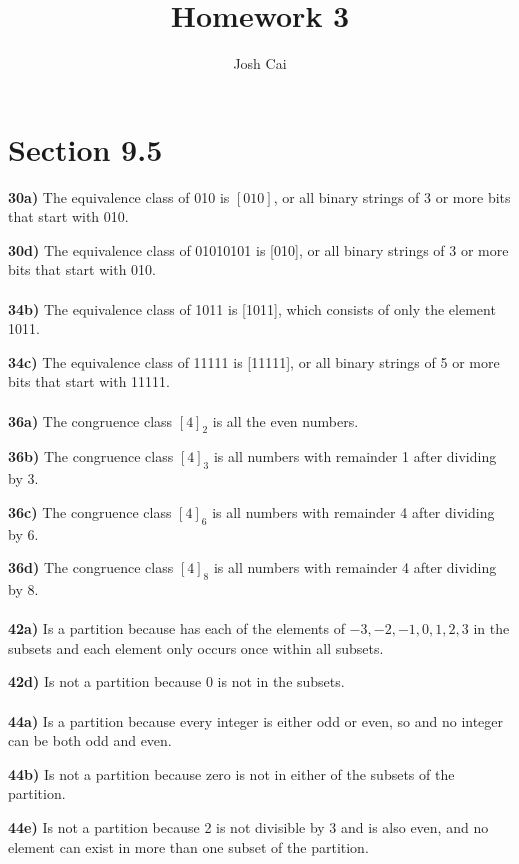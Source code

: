 \documentclass{article}
\begin{document}
\title{Homework 3}
\author{Josh Cai}

\maketitle
\section*{Section 9.5}



\textbf{30a)} The equivalence class of 010 is $[010]$, or all binary strings of 3 or more bits that start with 010.

\noindent\textbf{30d)}  The equivalence class of 01010101 is [010], or all binary strings of 3 or more bits that start with 010.
\\\\
\noindent\textbf{34b)} The equivalence class of 1011 is [1011], which consists of only the element 1011.

\noindent\textbf{34c)}  The equivalence class of 11111 is [11111], or all binary strings of 5 or more bits that start with 11111.
\\\\
\noindent\textbf{36a)} The congruence class $[4]_2$ is all the even numbers.

\noindent\textbf{36b)}  The congruence class $[4]_3$ is all numbers with remainder 1 after dividing by 3.

\noindent\textbf{36c)} The congruence class $[4]_6$ is all numbers with remainder 4 after dividing by 6.

\noindent\textbf{36d)}  The congruence class $[4]_8$ is all numbers with remainder 4 after dividing by 8.
\\\\
\noindent\textbf{42a)} Is a partition because has each of the elements of ${-3,-2,-1,0,1,2,3}$ in the subsets and each element only occurs once within all subsets.

\noindent\textbf{42d)}  Is not a partition because $0$ is not in the subsets.
\\\\
\noindent\textbf{44a)} Is a partition because every integer is either odd or even, so and no integer can be both odd and even.

\noindent\textbf{44b)}  Is not a partition because zero is not in either of the subsets of the partition.

\noindent\textbf{44e)}  Is not a partition because 2 is not divisible by 3 and is also even, and no element can exist in more than one subset of the partition.
\\\\
\end{document}
